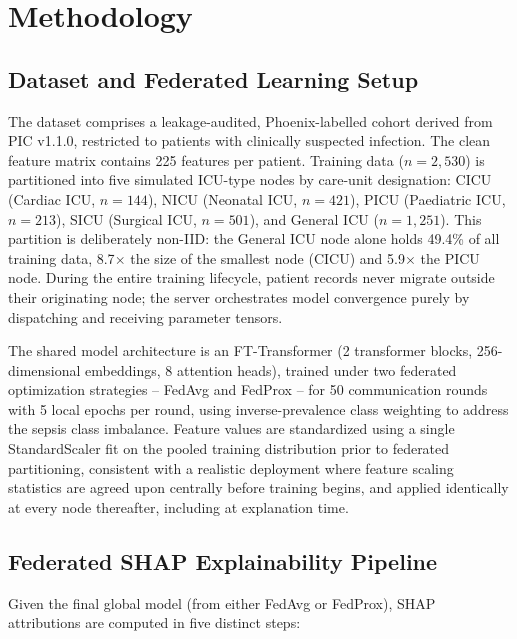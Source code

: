 \documentclass[runningheads]{llncs}
\begin{document}
\section{Methodology}\label{sec:method}

\subsection{Dataset and Federated Learning Setup}
The dataset comprises a leakage-audited, Phoenix-labelled cohort derived from PIC v1.1.0, restricted to patients with clinically suspected infection. The clean feature matrix contains 225 features per patient. Training data ($n = 2{,}530$) is partitioned into five simulated ICU-type nodes by care-unit designation: CICU (Cardiac ICU, $n = 144$), NICU (Neonatal ICU, $n = 421$), PICU (Paediatric ICU, $n = 213$), SICU (Surgical ICU, $n = 501$), and General ICU ($n = 1{,}251$). This partition is deliberately non-IID: the General ICU node alone holds 49.4\% of all training data, 8.7$\times$ the size of the smallest node (CICU) and 5.9$\times$ the PICU node. During the entire training lifecycle, patient records never migrate outside their originating node; the server orchestrates model convergence purely by dispatching and receiving parameter tensors.

The shared model architecture is an FT-Transformer \cite{gorishniy2021revisiting} (2 transformer blocks, 256-dimensional embeddings, 8 attention heads), trained under two federated optimization strategies -- FedAvg \cite{mcmahan2017fedavg} and FedProx \cite{li2020fedprox} -- for 50 communication rounds with 5 local epochs per round, using inverse-prevalence class weighting to address the sepsis class imbalance. Feature values are standardized using a single StandardScaler fit on the pooled training distribution prior to federated partitioning, consistent with a realistic deployment where feature scaling statistics are agreed upon centrally before training begins, and applied identically at every node thereafter, including at explanation time.

\subsection{Federated SHAP Explainability Pipeline}
Given the final global model (from either FedAvg or FedProx), SHAP attributions are computed in five distinct steps:
\end{document}
